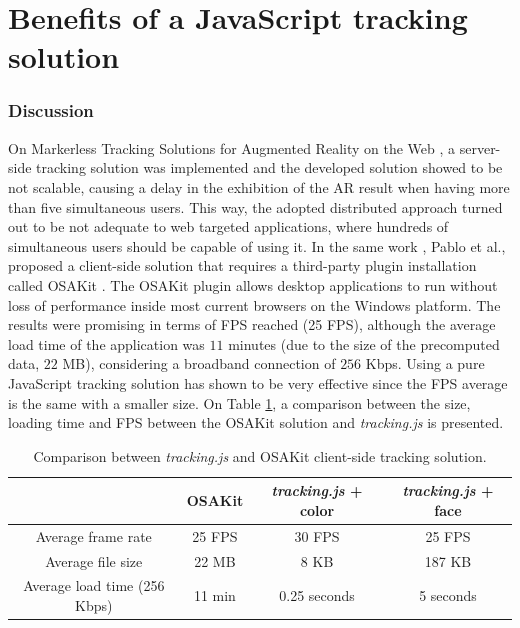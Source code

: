 

\section{Benefits of a JavaScript tracking solution} %
\label{sec:evaluation:js_tracking_solution}

\subsubsection{Discussion} %
\label{subsub:evaluation:results:js_tracking_solution:description}

On Markerless Tracking Solutions for Augmented Reality on the Web \cite{Pablo2013}, a server-side tracking solution was implemented and the developed solution showed to be not scalable, causing a delay in the exhibition of the AR result when having more than five simultaneous users. This way, the adopted distributed approach turned out to be not adequate to web targeted applications, where hundreds of simultaneous users should be capable of using it. In the same work \cite{Pablo2013}, Pablo et al., proposed a client-side solution that requires a third-party plugin installation called OSAKit \cite{OSAKit2013}. The OSAKit plugin allows desktop applications to run without loss of performance inside most current browsers on the Windows platform. The results were promising in terms of FPS reached (25 FPS), although the average load time of the application was $11$ minutes (due to the size of the precomputed data, $22$ MB), considering a broadband connection of $256$ Kbps. Using a pure JavaScript tracking solution has shown to be very effective since the FPS average is the same with a smaller size. On Table \ref{table:comparison_with_osakit}, a comparison between the size, loading time and FPS between the OSAKit solution and \textit{tracking.js} is presented.

\begin{table}[!htb]
    \centering %
    \begin{tabular}{|c|c|c|c|}
        \hline
        & OSAKit & \textit{tracking.js} + color & \textit{tracking.js} + face \\
        \hline
        Average frame rate & 25 FPS & 30 FPS & 25 FPS\\
        \hline
        Average file size & 22 MB & 8 KB & 187 KB\\
        \hline
        Average load time (256 Kbps) & 11 min & 0.25 seconds & 5 seconds\\
        \hline
    \end{tabular}
    \caption{Comparison between \textit{tracking.js} and OSAKit client-side tracking solution.}
    \label{table:comparison_with_osakit}
\end{table}



